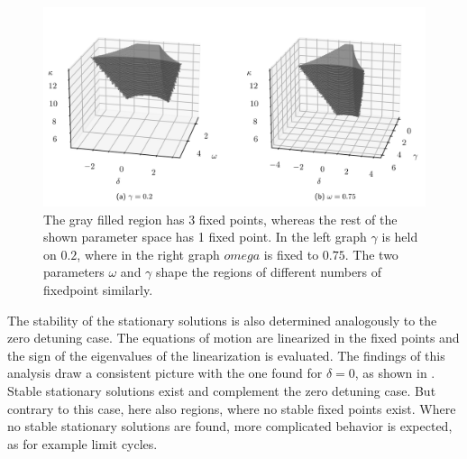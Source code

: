 \begin{figure}[H]
    \hspace*{-1.2cm}
    \includegraphics{pictures/numb_of_fixp_stab3d_gw.png}
    \caption{The gray filled region has 3 fixed points, whereas the rest of the shown parameter space has 1 fixed point. In the left graph $\gamma$ is held on $0.2$, where in the right graph $omega$ is fixed to $0.75$. The two parameters $\omega$ and $\gamma$ shape the regions of different numbers of fixedpoint similarly.}%
    \label{fig:numb_of_fixp_3D}
\end{figure}
The stability of the stationary solutions is also determined analogously to the zero detuning case. The equations of motion are linearized in the fixed points and the sign of the eigenvalues of the linearization is evaluated. The findings of this analysis draw a consistent picture with the one found for $\delta=0$, as shown in . Stable stationary solutions exist and complement the zero detuning case. But contrary to this case, here also regions, where no stable fixed points exist. Where no stable stationary solutions are found, more complicated behavior is expected, as for example limit cycles.
